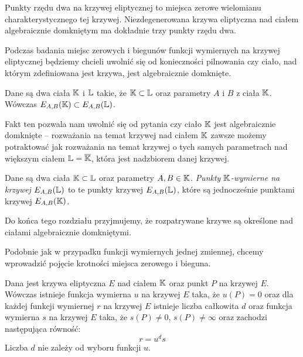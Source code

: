\begin{fact}
Punkty rzędu dwa na krzywej eliptycznej
to miejsca zerowe wielomianu charakterystycznego tej krzywej.
Niezdegenerowana krzywa eliptyczna nad ciałem algebraicznie domkniętym
ma dokładnie trzy punkty rzędu dwa.
\end{fact}

\noindent
Podczas badania miejsc zerowych i biegunów
funkcji wymiernych na krzywej eliptycznej
będziemy chcieli uwolnić się od konieczności pilnowania
czy ciało, nad którym zdefiniowana jest krzywa,
jest algebraicznie domknięte.

\begin{fact}
Dane są dwa ciała $\mathbb{K}$ i $\mathbb{L}$ takie, że $\mathbb{K} \subset \mathbb{L}$
oraz parametry $A$ i $B$ z ciała  $\mathbb{K}$.
Wówczas $E_{A,B}(\mathbb{K}) \subset E_{A,B}(\mathbb{L})$.
\end{fact}

\noindent
Fakt ten pozwala nam uwolnić się od pytania
czy ciało $\mathbb{K}$ jest algebraicznie domknięte --
rozważania na temat krzywej nad ciałem $\mathbb{K}$
zawsze możemy potraktować
jak rozważania na temat krzywej o tych samych parametrach
nad większym ciałem $\mathbb{L} = \overline{\mathbb{K}}$,
która jest nadzbiorem danej krzywej.

\begin{definition}
Dane są dwa ciała $\mathbb{K} \subset \mathbb{L}$ oraz parametry $A, B \in \mathbb{K}$.
\emph{Punkty $\mathbb{K}$-wymierne na krzywej $E_{A,B}(\mathbb{L})$}
to te punkty krzywej $E_{A,B}(\mathbb{L})$,
które są jednocześnie punktami krzywej $E_{A,B}(\mathbb{K})$.
\end{definition}

\begin{remark}
Do końca tego rozdziału przyjmujemy,
że rozpatrywane krzywe są określone nad ciałami algebraicznie domkniętymi.
\end{remark}

\noindent
Podobnie jak w przypadku funkcji wymiernych jednej zmiennej,
chcemy wprowadzić pojęcie krotności miejsca zerowego i bieguna.

\begin{theorem}\label{uniformizer_existence_theorem}
Dana jest krzywa eliptyczna $E$ nad ciałem $\mathbb{K}$
oraz punkt $P$ na krzywej $E$.
Wówczas istnieje funkcja wymierna $u$ na krzywej $E$ taka, że $u(P) = 0$
oraz dla każdej funkcji wymiernej $r$ na krzywej $E$
istnieje liczba całkowita $d$
oraz funkcja wymierna $s$ na krzywej $E$ taka,
że $s(P) \neq 0$, $s(P) \neq \infty$ oraz zachodzi następująca równość:
\begin{equation}\label{uniformizer_decomposition_eqn}
r = u^ds
\end{equation}
Liczba $d$ nie zależy od wyboru funkcji $u$.
\end{theorem}

